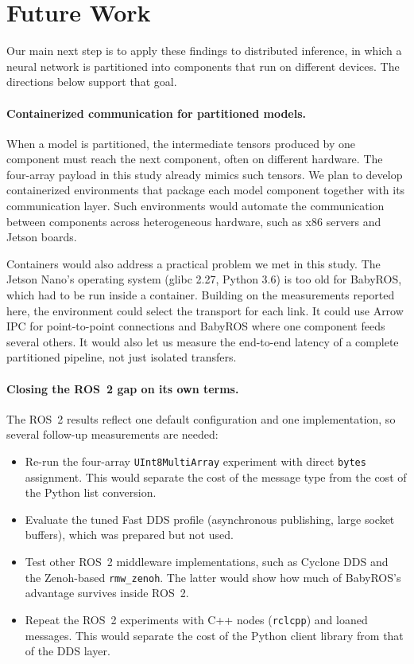 \section{Future Work}
\label{sec:future-work}

Our main next step is to apply these findings to distributed inference, in which a
neural network is partitioned into components that run on different devices. The
directions below support that goal.

\paragraph{Containerized communication for partitioned models.} When a model is
partitioned, the intermediate tensors produced by one component must reach the next
component, often on different hardware. The four-array payload in this study already
mimics such tensors. We plan to develop containerized environments that package each
model component together with its communication layer. Such environments would
automate the communication between components across heterogeneous hardware, such as
x86 servers and Jetson boards.

Containers would also address a practical problem we met in this study. The Jetson
Nano's operating system (glibc 2.27, Python 3.6) is too old for BabyROS, which had to
be run inside a container. Building on the measurements reported here, the environment
could select the transport for each link. It could use Arrow IPC for point-to-point
connections and BabyROS where one component feeds several others. It would also let
us measure the end-to-end latency of a complete partitioned pipeline, not just
isolated transfers.

\paragraph{Closing the ROS~2 gap on its own terms.} The ROS~2 results reflect one
default configuration and one implementation, so several follow-up measurements are
needed:
\begin{itemize}
  \item Re-run the four-array \texttt{UInt8MultiArray} experiment with direct
  \texttt{bytes} assignment. This would separate the cost of the message type from the
  cost of the Python list conversion.
  \item Evaluate the tuned Fast DDS profile (asynchronous publishing, large socket
  buffers), which was prepared but not used.
  \item Test other ROS~2 middleware implementations, such as Cyclone DDS and the
  Zenoh-based \texttt{rmw\_zenoh}. The latter would show how much of BabyROS's
  advantage survives inside ROS~2.
  \item Repeat the ROS~2 experiments with C++ nodes (\texttt{rclcpp}) and loaned
  messages. This would separate the cost of the Python client library from that of
  the DDS layer.
\end{itemize}


